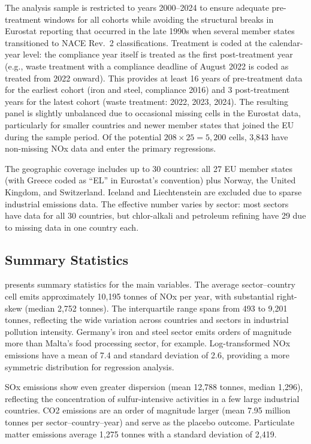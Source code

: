 \documentclass[12pt]{article}
\begin{document}
The analysis sample is restricted to years 2000--2024 to ensure adequate pre-treatment windows for all cohorts while avoiding the structural breaks in Eurostat reporting that occurred in the late 1990s when several member states transitioned to NACE Rev.~2 classifications. Treatment is coded at the calendar-year level: the compliance year itself is treated as the first post-treatment year (e.g., waste treatment with a compliance deadline of August 2022 is coded as treated from 2022 onward). This provides at least 16 years of pre-treatment data for the earliest cohort (iron and steel, compliance 2016) and 3 post-treatment years for the latest cohort (waste treatment: 2022, 2023, 2024). The resulting panel is slightly unbalanced due to occasional missing cells in the Eurostat data, particularly for smaller countries and newer member states that joined the EU during the sample period. Of the potential $208 \times 25 = 5{,}200$ cells, 3,843 have non-missing NOx data and enter the primary regressions.

The geographic coverage includes up to 30 countries: all 27 EU member states (with Greece coded as ``EL'' in Eurostat's convention) plus Norway, the United Kingdom, and Switzerland. Iceland and Liechtenstein are excluded due to sparse industrial emissions data. The effective number varies by sector: most sectors have data for all 30 countries, but chlor-alkali and petroleum refining have 29 due to missing data in one country each.

\subsection{Summary Statistics}

 presents summary statistics for the main variables. The average sector--country cell emits approximately 10,195 tonnes of NOx per year, with substantial right-skew (median 2,752 tonnes). The interquartile range spans from 493 to 9,201 tonnes, reflecting the wide variation across countries and sectors in industrial pollution intensity. Germany's iron and steel sector emits orders of magnitude more than Malta's food processing sector, for example. Log-transformed NOx emissions have a mean of 7.4 and standard deviation of 2.6, providing a more symmetric distribution for regression analysis.

SOx emissions show even greater dispersion (mean 12,788 tonnes, median 1,296), reflecting the concentration of sulfur-intensive activities in a few large industrial countries. CO2 emissions are an order of magnitude larger (mean 7.95 million tonnes per sector--country--year) and serve as the placebo outcome. Particulate matter emissions average 1,275 tonnes with a standard deviation of 2,419.
\end{document}

